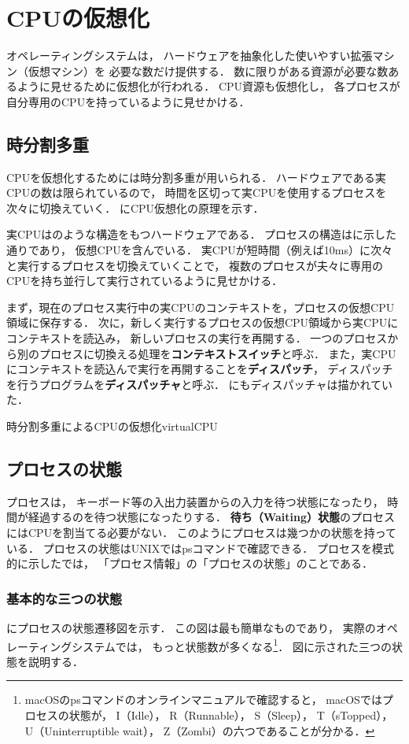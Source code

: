 \chapter{CPUの仮想化}
オペレーティングシステムは，
ハードウェアを抽象化した使いやすい拡張マシン（仮想マシン）を
必要な数だけ提供する．
数に限りがある資源が必要な数あるように見せるために仮想化が行われる．
CPU資源も仮想化し，
各プロセスが自分専用のCPUを持っているように見せかける．

\section{時分割多重}
CPUを仮想化するためには時分割多重が用いられる．
ハードウェアである実CPUの数は限られているので，
時間を区切って実CPUを使用するプロセスを次々に切換えていく．
にCPU仮想化の原理を示す．

実CPUはのような構造をもつハードウェアである．
プロセスの構造はに示した通りであり，
仮想CPUを含んでいる．
実CPUが短時間（例えば10ms）に次々と実行するプロセスを切換えていくことで，
複数のプロセスが夫々に専用のCPUを持ち並行して実行されているように見せかける．

まず，現在のプロセス実行中の実CPUのコンテキストを，プロセスの仮想CPU領域に保存する．
次に，新しく実行するプロセスの仮想CPU領域から実CPUにコンテキストを読込み，
新しいプロセスの実行を再開する．
一つのプロセスから別のプロセスに切換える処理を{\bf コンテキストスイッチ}と呼ぶ．
また，実CPUにコンテキストを読込んで実行を再開することを{\bf ディスパッチ}，
ディスパッチを行うプログラムを{\bf ディスパッチャ}と呼ぶ．
にもディスパッチャは描かれていた．

{時分割多重によるCPUの仮想化}{virtualCPU}

\section{プロセスの状態}
\label{procState}
プロセスは，
キーボード等の入出力装置からの入力を待つ状態になったり，
時間が経過するのを待つ状態になったりする．
{\bf 待ち（Waiting）状態}のプロセスにはCPUを割当てる必要がない．
このようにプロセスは幾つかの状態を持っている．
プロセスの状態はUNIXではpsコマンドで確認できる．
プロセスを模式的に示したでは，
「プロセス情報」の「プロセスの状態」のことである．

\subsection{基本的な三つの状態}
にプロセスの状態遷移図を示す．
この図は最も簡単なものであり，
実際のオペレーティングシステムでは，
もっと状態数が多くなる\footnote{
macOSのpsコマンドのオンラインマニュアルで確認すると，
macOSではプロセスの状態が，
I（Idle），
R（Runnable），
S（Sleep），
T（sTopped），
U（Uninterruptible wait），
Z（Zombi）の六つであることが分かる．}．
図に示された三つの状態を説明する．

